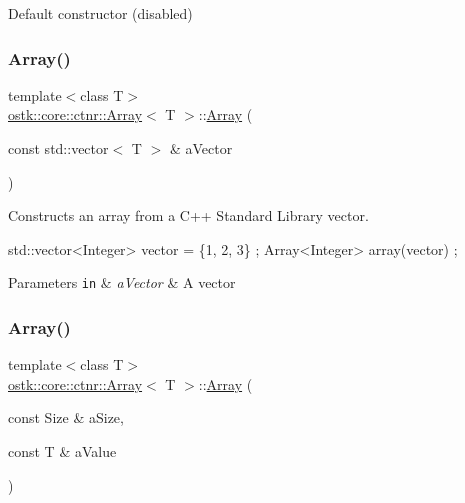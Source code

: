 Default constructor (disabled) 

\mbox{\label{classostk_1_1core_1_1ctnr_1_1_array_ad26e8cf9b109bc6c821c7408cac2935b}} 
\subsubsection{\texorpdfstring{Array()}{Array()}\hspace{0.1cm}{\footnotesize\ttfamily [2/8]}}
{\footnotesize\ttfamily template$<$class T$>$ \\
\hyperlink{classostk_1_1core_1_1ctnr_1_1_array}{ostk\+::core\+::ctnr\+::\+Array}$<$ T $>$\+::\hyperlink{classostk_1_1core_1_1ctnr_1_1_array}{Array} (\begin{DoxyParamCaption}\item[{const std\+::vector$<$ T $>$ \&}]{a\+Vector }\end{DoxyParamCaption})}



Constructs an array from a C++ Standard Library vector. 


\begin{DoxyCode}
std::vector<Integer> vector = \{1, 2, 3\} ;
Array<Integer> array(vector) ;
\end{DoxyCode}



\begin{DoxyParams}[1]{Parameters}
\mbox{\tt in}  & {\em a\+Vector} & A vector \\
\hline
\end{DoxyParams}
\mbox{\label{classostk_1_1core_1_1ctnr_1_1_array_ac4ff1f3f9c03f53963ad04dedd2addf2}} 
\subsubsection{\texorpdfstring{Array()}{Array()}\hspace{0.1cm}{\footnotesize\ttfamily [3/8]}}
{\footnotesize\ttfamily template$<$class T$>$ \\
\hyperlink{classostk_1_1core_1_1ctnr_1_1_array}{ostk\+::core\+::ctnr\+::\+Array}$<$ T $>$\+::\hyperlink{classostk_1_1core_1_1ctnr_1_1_array}{Array} (\begin{DoxyParamCaption}\item[{const Size \&}]{a\+Size,  }\item[{const T \&}]{a\+Value }\end{DoxyParamCaption})}



